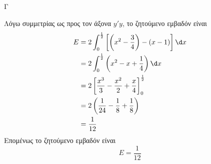 \begin{thema}{Γ}
\begin{erwthma}
Λόγω συμμετρίας ως προς τον άξονα $y'y$, το ζητούμενο εμβαδόν είναι
\begin{align*}
E&=2\dint_0^{\frac{1}{2}}\left[\left(x^2-\frac{3}{4}\right)-(x-1)\right]\d x\\
&=2\dint_0^{\frac{1}{2}}\left(x^2-x+\frac{1}{4}\right)\d x\\
&=2\left[\frac{x^3}{3}-\frac{x^2}{2}+\frac{x}{4}\right]_0^{\frac{1}{2}}\\
&=2\left(\frac{1}{24}-\frac{1}{8}+\frac{1}{8}\right)\\
&=\frac{1}{12}
\end{align*}
Επομένως το ζητούμενο εμβαδόν είναι
\[E=\frac{1}{12}\]
\end{erwthma}
\end{thema}


